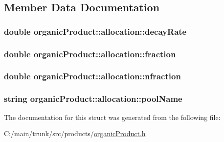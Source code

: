\subsection{Member Data Documentation}
\hypertarget{structorganic_product_1_1allocation_a5cf7db6c1de20c19c5158f94f4b504b5}{
\subsubsection[{decayRate}]{\setlength{\rightskip}{0pt plus 5cm}double {\bf organicProduct::allocation::decayRate}}}
\label{structorganic_product_1_1allocation_a5cf7db6c1de20c19c5158f94f4b504b5}
\hypertarget{structorganic_product_1_1allocation_a2e691dee8b1f9800af303e6aff5230d4}{
\subsubsection[{fraction}]{\setlength{\rightskip}{0pt plus 5cm}double {\bf organicProduct::allocation::fraction}}}
\label{structorganic_product_1_1allocation_a2e691dee8b1f9800af303e6aff5230d4}
\hypertarget{structorganic_product_1_1allocation_a41b380701a6c881409e4d1297fbf8517}{
\subsubsection[{nfraction}]{\setlength{\rightskip}{0pt plus 5cm}double {\bf organicProduct::allocation::nfraction}}}
\label{structorganic_product_1_1allocation_a41b380701a6c881409e4d1297fbf8517}
\hypertarget{structorganic_product_1_1allocation_a9dfa44d3c9a2b6c6bfd607455ba7eac9}{
\subsubsection[{poolName}]{\setlength{\rightskip}{0pt plus 5cm}string {\bf organicProduct::allocation::poolName}}}
\label{structorganic_product_1_1allocation_a9dfa44d3c9a2b6c6bfd607455ba7eac9}


The documentation for this struct was generated from the following file:\begin{DoxyCompactItemize}
\item 
C:/main/trunk/src/products/\hyperlink{organic_product_8h}{organicProduct.h}\end{DoxyCompactItemize}
